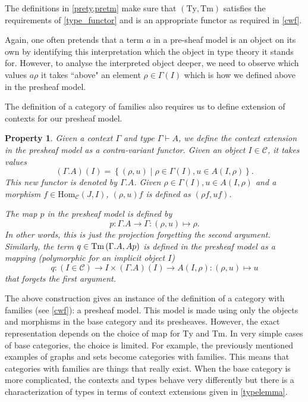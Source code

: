 \documentclass[12pt,a4paper,twoside,xetex]{book}
\newtheorem{property}[theorem]{Property}
\begin{document}
The definitions in \cref{prety,pretm} make sure that $(\text{Ty},\text{Tm})$  satisfies the requirements of \cref{type_functor} and is an appropriate functor as required in \cref{cwf}.


Again, one often pretends that a term $a$ in a pre-sheaf model is an object on its own by identifying this interpretation which the object in type theory it stands for. However, to analyse the interpreted object deeper,  we need to observe which values $a\rho$ it takes ``above" an element $\rho \in \Gamma (I)$ which is how we defined above in the presheaf model.

The definition of a category of families also requires us to define extension of contexts for our presheaf model. 

\begin{property}\label{preext}
Given a context $\Gamma$ and type $\Gamma \vdash A$, we define the context extension in the presheaf model as a contra-variant functor. Given an object $I \in \mathcal{C}$, it takes values $$(\Gamma . A)(I) = \left\{ (\rho , u) \mid \rho \in \Gamma (I) , u \in A (I, \rho ) \right\}.$$ This new functor is denoted by $\Gamma . A$. Given $\rho \in \Gamma (I), u \in A(I,\rho )$ and a morphism $f \in \text{Hom}_{\mathcal{C}}(J,I)$, $(\rho, u)f$ is defined as $(\rho f, uf)$. 


The map $p$ in the presheaf model is defined by $$p: \Gamma . A \rightarrow \Gamma : (\rho , u ) \mapsto \rho.$$ In other words, this is just the projection forgetting the second argument. Similarly, the term $q \in \text{Tm}\left(\Gamma . A,Ap\right) $ is defined in the presheaf model  as a mapping (polymorphic for an implicit object $I$) $$q: (I \in \mathcal{C}) \rightarrow I \times (\Gamma . A)(I) \rightarrow A(I,\rho): (\rho, u) \mapsto u$$ that forgets the first argument.
\end{property}

The above construction gives an instance of the definition of a category with families (see \cref{cwf}): a presheaf model. This model is made using only the objects and morphisms in the base category and its presheaves. However, the exact representation depends on the choice of map for $\text{Ty}$ and $\text{Tm}$. In very simple cases of base categories, the choice is limited. For example, the previously mentioned examples of graphs and sets become categories with families. This means that categories with families are things that really exist. When the base category is more complicated, the contexts and types behave very differently but there is a characterization of types in terms of context extensions given in \cref{typelemma}.
\end{document}
